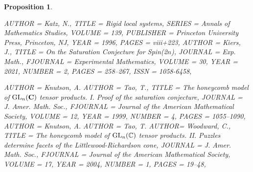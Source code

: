 \documentclass[11pt]{amsart}
\newtheorem{proposition}[theorem]{Proposition}
\numberwithin{theorem}{subsection}
\begin{document}
{\begin{proposition}
\begin{bibdiv}
\begin{biblist}
 {
    AUTHOR = {Katz, N.},
     TITLE = {Rigid local systems},
    SERIES = {Annals of Mathematics Studies},
    VOLUME = {139},
 PUBLISHER = {Princeton University Press, Princeton, NJ},
      YEAR = {1996},
     PAGES = {viii+223},
}
 {
    AUTHOR = {Kiers, J.},
     TITLE = {On the {S}aturation {C}onjecture for {S}pin(2{$n$})},
   JOURNAL = {Exp. Math.},
  FJOURNAL = {Experimental Mathematics},
    VOLUME = {30},
      YEAR = {2021},
    NUMBER = {2},
     PAGES = {258--267},
      ISSN = {1058-6458},
}




 {
    AUTHOR = {Knutson, A.}
    AUTHOR =  {Tao, T.},
     TITLE = {The honeycomb model of {${\rm GL}_n({\bf C})$} tensor
              products. {I}. {P}roof of the saturation conjecture},
   JOURNAL = {J. Amer. Math. Soc.},
  FJOURNAL = {Journal of the American Mathematical Society},
    VOLUME = {12},
      YEAR = {1999},
    NUMBER = {4},
     PAGES = {1055--1090},
}
 {
    AUTHOR = {Knutson, A.}
    AUTHOR =  {Tao, T.}
    AUTHOR=  {Woodward, C.},
     TITLE = {The honeycomb model of {${\rm GL}_n(\Bbb C)$} tensor products.
              {II}. {P}uzzles determine facets of the
              {L}ittlewood-{R}ichardson cone},
   JOURNAL = {J. Amer. Math. Soc.},
  FJOURNAL = {Journal of the American Mathematical Society},
    VOLUME = {17},
      YEAR = {2004},
    NUMBER = {1},
     PAGES = {19--48},
}


\end{biblist}
\end{bibdiv}
\end{proposition}}
\end{document}
